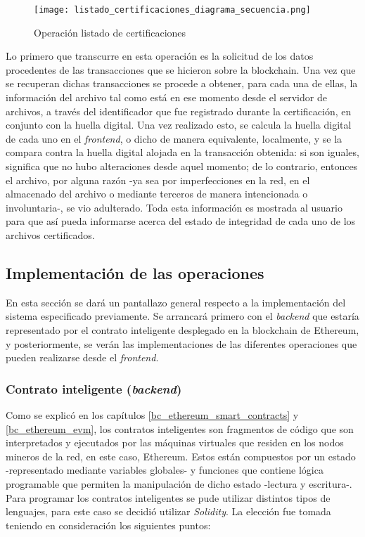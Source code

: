 \begin{figure}[H]
  \texttt{[image: listado\_certificaciones\_diagrama\_secuencia.png]}
  \centering
  \caption{Operación listado de certificaciones}
  \label{fig:listado-certificaciones-diagrama-secuencia}
\end{figure}

Lo primero que transcurre en esta operación es la solicitud de los datos procedentes de las transacciones que se hicieron sobre la blockchain. Una vez que se recuperan dichas transacciones se procede a obtener, para cada una de ellas, la información del archivo tal como está en ese momento desde el servidor de archivos, a través del identificador que fue registrado durante la certificación, en conjunto con la huella digital.  Una vez realizado esto, se calcula la huella digital de cada uno en el \textit{frontend}, o dicho de manera equivalente, localmente, y se la compara contra la huella digital alojada en la transacción obtenida: si son iguales, significa que no hubo alteraciones desde aquel momento; de lo contrario, entonces el archivo, por alguna razón -ya sea por imperfecciones en la red, en el almacenado del archivo o mediante terceros de manera intencionada o involuntaria-, se vio adulterado.
Toda esta información es mostrada al usuario para que así pueda informarse acerca del estado de integridad de cada uno de los archivos certificados.

\subsection{Implementación de las operaciones}

En esta sección se dará un pantallazo general respecto a la implementación del sistema especificado previamente. Se arrancará primero con el \textit{backend} que estaría representado por el contrato inteligente desplegado en la blockchain de Ethereum, y posteriormente, se verán las implementaciones de las diferentes operaciones que pueden realizarse desde el \textit{frontend}.

\subsubsection{Contrato inteligente (\textit{backend})}

Como se explicó en los capítulos \ref{bc_ethereum_smart_contracts} y \ref{bc_ethereum_evm}, los contratos inteligentes son fragmentos de código que son interpretados y ejecutados por las máquinas virtuales que residen en los nodos mineros de la red, en este caso, Ethereum. Estos están compuestos por un estado -representado mediante variables globales- y funciones que contiene lógica programable que permiten la manipulación de dicho estado -lectura y escritura-. Para programar los contratos inteligentes se pude utilizar distintos tipos de lenguajes, para este caso se decidió utilizar \textit{Solidity}\cite{Solidity2019}. La elección fue tomada teniendo en consideración los siguientes puntos:


